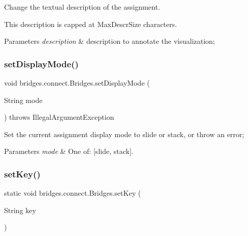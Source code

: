 Change the textual description of the assignment. 

This description is capped at Max\+Descr\+Size characters.


\begin{DoxyParams}{Parameters}
{\em description} & description to annotate the visualization; \\
\hline
\end{DoxyParams}
\mbox{\label{classbridges_1_1connect_1_1_bridges_aaa1a44a689daa26a841d0e8d31839861}} 
\subsubsection{\texorpdfstring{set\+Display\+Mode()}{setDisplayMode()}}
{\footnotesize\ttfamily void bridges.\+connect.\+Bridges.\+set\+Display\+Mode (\begin{DoxyParamCaption}\item[{String}]{mode }\end{DoxyParamCaption}) throws Illegal\+Argument\+Exception}

Set the current assignment display mode to slide or stack, or throw an error; 
\begin{DoxyParams}{Parameters}
{\em mode} & One of\+: \mbox{[}\textquotesingle{}slide\textquotesingle{}, \textquotesingle{}stack\textquotesingle{}\mbox{]}. \\
\hline
\end{DoxyParams}
\mbox{\label{classbridges_1_1connect_1_1_bridges_ab69e89ec7d2e674a8b8c4b0be0c63397}} 
\subsubsection{\texorpdfstring{set\+Key()}{setKey()}}
{\footnotesize\ttfamily static void bridges.\+connect.\+Bridges.\+set\+Key (\begin{DoxyParamCaption}\item[{String}]{key }\end{DoxyParamCaption})\hspace{0.3cm}{\ttfamily [static]}}


